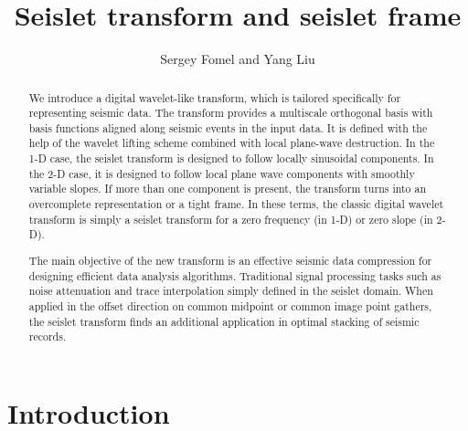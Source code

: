 \title{Seislet transform and seislet frame}
\author{Sergey Fomel and Yang Liu}



\address{Bureau of Economic Geology \\
John A. and Katherine G. Jackson School of Geosciences \\
The University of Texas at Austin \\
University Station, Box X \\
Austin, TX 78713-8924}

\maketitle

\begin{abstract}
  We introduce a digital wavelet-like transform, which is tailored
  specifically for representing seismic data. The transform provides a
  multiscale orthogonal basis with basis functions aligned along
  seismic events in the input data. It is defined with the help of the
  wavelet lifting scheme combined with local plane-wave
  destruction. In the 1-D case, the seislet transform is designed to
  follow locally sinusoidal components. In the 2-D case, it is
  designed to follow local plane wave components with smoothly
  variable slopes. If more than one component is present, the
  transform turns into an overcomplete representation or a {tight}
  frame.  In these terms, the classic digital wavelet transform is
  simply a seislet transform for a zero frequency (in 1-D) or zero
  slope (in 2-D).

  The main objective of the new transform is an {effective} seismic
  data compression for designing efficient data analysis
  algorithms. Traditional signal processing tasks such as noise
  {attenuation} and trace interpolation   simply
  defined in the seislet domain. When applied in the offset direction
  on common midpoint or common image point gathers, the seislet
  transform finds an additional application in optimal stacking of
  seismic records.
\end{abstract}

\section{Introduction}

